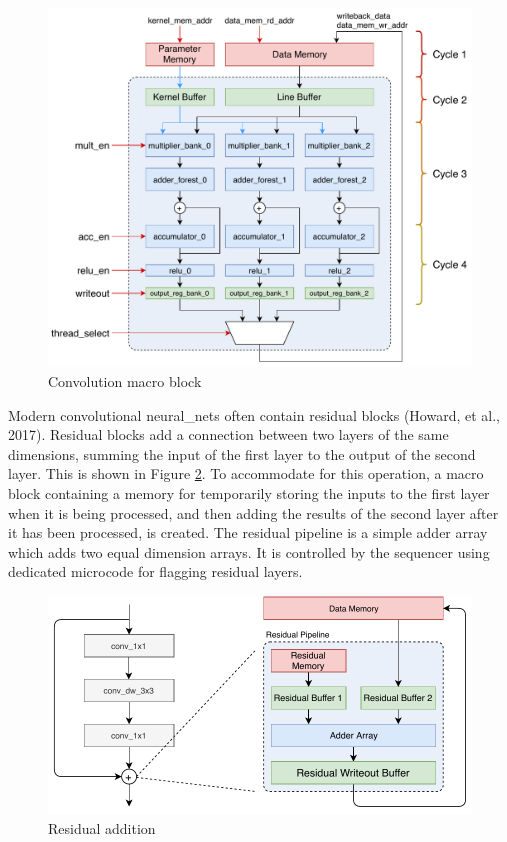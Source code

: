 \documentclass{uw-ece-wkrpt}
\begin{document}
\begin{figure}
\centering
\includegraphics[width=\textwidth]{figures/convolution_macro}
\caption{Convolution macro block \cite{Ma2017An-automatic-RT}}\label{fig:convolution_macro}
\end{figure}

Modern convolutional \glspl{neural_net} often contain residual blocks (Howard, et al., 2017). Residual blocks add a connection between two layers of the same dimensions, summing the input of the first layer to the output of the second layer. This is shown in Figure \ref{fig:residual_addition}. To accommodate for this operation, a macro block containing a memory for temporarily storing the inputs to the first layer when it is being processed, and then adding the results of the second layer after it has been processed, is created. The residual pipeline is a simple adder array which adds two equal dimension arrays. It is controlled by the sequencer using dedicated microcode for flagging residual layers.

\begin{figure}
\centering
\includegraphics{figures/residual_addition}
\caption{Residual addition}\label{fig:residual_addition}
\end{figure}
\end{document}
